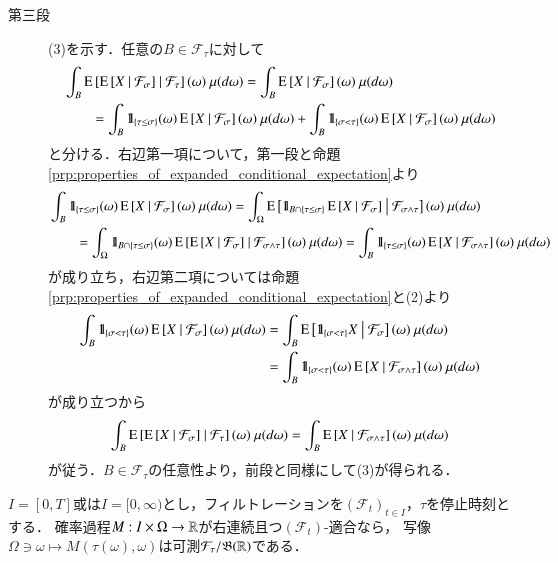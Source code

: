 \begin{prf}
\begin{description}
			\item[第三段]
				(3)を示す．任意の$B \in \mathcal{F}_\tau$に対して
				\begin{align}
					&\int_B \cexp{\cexp{X}{\mathcal{F}_\sigma}}{\mathcal{F}_\tau}(\omega)\ \mu(d\omega)
					= \int_B \cexp{X}{\mathcal{F}_\sigma}(\omega)\ \mu(d\omega) \\
					&\qquad = \int_B \defunc_{\{\tau \leq \sigma\}}(\omega) \cexp{X}{\mathcal{F}_\sigma}(\omega)\ \mu(d\omega)
						+ \int_B \defunc_{\{\sigma < \tau\}}(\omega) \cexp{X}{\mathcal{F}_\sigma}(\omega)\ \mu(d\omega)
				\end{align}
				と分ける．右辺第一項について，第一段と命題\ref{prp:properties_of_expanded_conditional_expectation}より
				\begin{align}
					&\int_B \mbox{1}\hspace{-0.25em}\mbox{l}_{\{\tau \leq \sigma\}}(\omega) \operatorname{E} \left[ X \ \middle|\ \mathcal{F}_\sigma \right](\omega)\ \mu(d\omega)
					= \int_\Omega \operatorname{E} \left[ \mbox{1}\hspace{-0.25em}\mbox{l}_{B \cap \{\tau \leq \sigma\}} \operatorname{E} \left[ X \ \middle|\ \mathcal{F}_\sigma \right] \ \middle|\ \mathcal{F}_{\sigma \wedge \tau} \right](\omega)\ \mu(d\omega) \\
					&\qquad = \int_\Omega \mbox{1}\hspace{-0.25em}\mbox{l}_{B \cap \{\tau \leq \sigma\}}(\omega) \operatorname{E} \left[ \operatorname{E} \left[ X \ \middle|\ \mathcal{F}_\sigma \right] \ \middle|\ \mathcal{F}_{\sigma \wedge \tau} \right](\omega)\ \mu(d\omega)
					= \int_B \mbox{1}\hspace{-0.25em}\mbox{l}_{\{\tau \leq \sigma\}}(\omega) \operatorname{E} \left[ X \ \middle|\ \mathcal{F}_{\sigma \wedge \tau} \right](\omega)\ \mu(d\omega)
				\end{align}
				が成り立ち，右辺第二項については命題\ref{prp:properties_of_expanded_conditional_expectation}と(2)より
				\begin{align}
					\int_B \mbox{1}\hspace{-0.25em}\mbox{l}_{\{\sigma < \tau\}}(\omega) \operatorname{E} \left[ X \ \middle|\ \mathcal{F}_\sigma \right](\omega)\ \mu(d\omega)
					&= \int_B \operatorname{E} \left[ \mbox{1}\hspace{-0.25em}\mbox{l}_{\{\sigma < \tau\}} X \ \middle|\ \mathcal{F}_\sigma \right](\omega)\ \mu(d\omega) \\
					&= \int_B \mbox{1}\hspace{-0.25em}\mbox{l}_{\{\sigma < \tau\}}(\omega) \operatorname{E} \left[ X \ \middle|\ \mathcal{F}_{\sigma \wedge \tau} \right](\omega)\ \mu(d\omega)
				\end{align}
				が成り立つから
				\begin{align}
					\int_B \cexp{\cexp{X}{\mathcal{F}_\sigma}}{\mathcal{F}_\tau}(\omega)\ \mu(d\omega)
					= \int_B \cexp{X}{\mathcal{F}_{\sigma \wedge \tau}}(\omega)\ \mu(d\omega)
				\end{align}
				が従う．$B \in \mathcal{F}_\tau$の任意性より，前段と同様にして(3)が得られる．
				\QED
		\end{description}
	\end{prf}
	
	\begin{screen}
		\begin{thm}[停止時刻との合成写像の可測性]
			$I = [0,T]$或は$I = [0,\infty)$とし，フィルトレーションを$(\mathcal{F}_t)_{t \in I}$，$\tau$を停止時刻とする．
			確率過程$M:I \times \Omega \rightarrow \mathbb{R}$が右連続且つ$(\mathcal{F}_t)$-適合なら，
			写像$\Omega \ni \omega \longmapsto M(\tau(\omega),\omega)$は可測$\mathcal{F}_\tau/\mathfrak{B}(\mathbb{R})$である．
			\label{thm:measurability_of_stopping_time}
		\end{thm}
	\end{screen}
	
